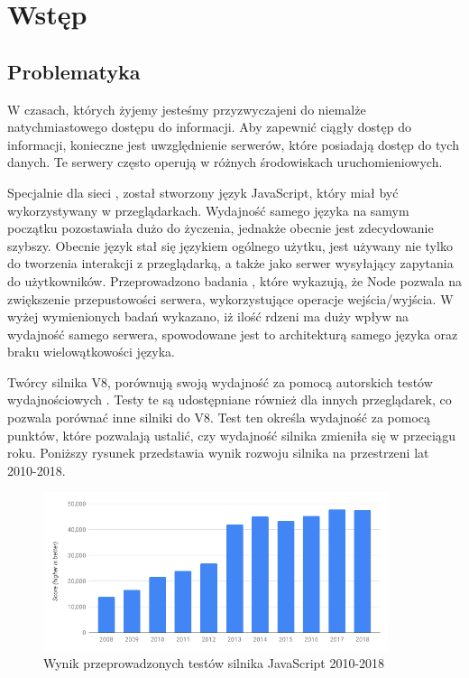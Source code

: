 \section*{Wstęp}

\subsection*{Problematyka}
W czasach, których żyjemy jesteśmy przyzwyczajeni do niemalże natychmiastowego dostępu do informacji. Aby zapewnić ciągły dostęp do informacji, konieczne jest uwzględnienie serwerów, które posiadają dostęp do tych danych. Te serwery często operują w różnych środowiskach uruchomieniowych.

Specjalnie dla sieci , został stworzony język JavaScript, który miał być wykorzystywany w przeglądarkach. Wydajność samego języka na samym początku pozostawiała dużo do życzenia, jednakże obecnie jest zdecydowanie szybszy. Obecnie język stał się językiem ogólnego użytku, jest używany nie tylko do tworzenia interakcji z przeglądarką, a także jako serwer wysyłający zapytania  do użytkowników. Przeprowadzono badania \cite{comparison_of_servers}, które wykazują, że Node pozwala na zwiększenie przepustowości serwera, wykorzystujące operacje wejścia/wyjścia. W wyżej wymienionych badań wykazano, iż ilość rdzeni ma duży wpływ na wydajność samego serwera, spowodowane jest to architekturą samego języka oraz braku wielowątkowości języka. 

Twórcy silnika V8, porównują swoją wydajność za pomocą autorskich testów wydajnościowych \cite{ten_years_of_v8_chromium} \cite{ten_years_of_v8}. Testy te są udostępniane również dla innych przeglądarek, co pozwala porównać inne silniki do V8. Test ten określa wydajność za pomocą punktów, które pozwalają ustalić, czy wydajność silnika zmieniła się w przeciągu roku. Poniższy rysunek przedstawia wynik rozwoju silnika na przestrzeni lat 2010-2018.

\begin{figure}[h]
  \centering
  \includegraphics[width=0.9\textwidth]{Figures/v8_bench_2010_2018.png}
  \caption{Wynik przeprowadzonych testów silnika JavaScript 2010-2018}
  \label{fig:performance_v8}
\end{figure}

